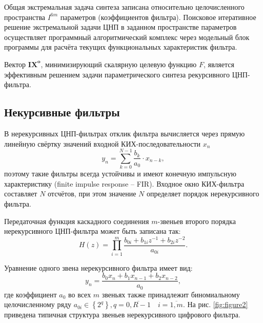 Общая экстремальная задача синтеза записана относительно целочисленного пространства $I^{6m}$ параметров (коэффициентов фильтра). Поисковое итеративное решение экстремальной задачи ЦНП в заданном пространстве параметров осуществляет программный алгоритмический комплекс через
модельный блок программы для расчёта текущих функциональных характеристик фильтра. 

Вектор $\boldsymbol{I X}^{\boldsymbol{o}}$, минимизирующий скалярную
целевую функцию $F$, является эффективным решением задачи параметрического синтеза рекурсивного ЦНП-фильтра.

\subsection{Некурсивные фильтры}

В нерекурсивных ЦНП-фильтрах отклик фильтра  вычисляется через прямую линейную свёртку значений входной КИХ-последовательности $x_n$ 
\begin{equation}
  y_{n}=\sum_{k=0}^{N-1} \frac{b_{k}}{a_{0}} \cdot x_{n-k},
\end{equation}
поэтому такие фильтры всегда устойчивы и имеют конечную импульсную характеристику (finite impulse response -- FIR). Входное окно КИХ-фильтра составляет $N$ отсчётов, при этом значение $N$ определяет порядок нерекурсивного фильтра.

Передаточная функция каскадного соединения $m$-звеньев второго порядка нерекурсивного ЦНП-фильтра может быть записана так:
\begin{equation}
  H(z)=\prod_{i=1}^{m} \frac{b_{0 i}+b_{1 i} z^{-1}+b_{2 i} z^{-2}}{a_{0 i}}.
\end{equation}

Уравнение одного звена нерекурсивного фильтра имеет вид:
\begin{equation}
  y_{n}=\frac{b_{0} x_{n}+b_{1} x_{n-1}+b_{2} x_{n-2}}{a_0},
\end{equation}
где коэффициент $a_0$  во всех  $m$  звеньях также принадлежит биномиальному целочисленному ряду $a_{0 i}
\in\left\{2^{q}\right\}, q=\overline{0, R-1} \quad i=\overline{1, m}$. На рис. \ref{fig:figure2} приведена типичная
структура звеньев нерекурсивного цифрового фильтра.

